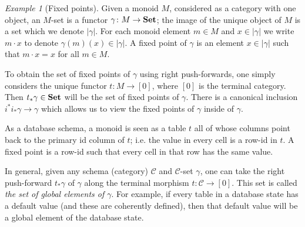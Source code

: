 \documentclass{amsart}
\def\mc{\mathcal}
\def\to{\rightarrow}
\def\taking{\colon}
\def\Set{{\bf Set}}
\def\mcC{\mc{C}}
\theoremstyle{remark}
\newtheorem{example}[theorem]{Example}
\theoremstyle{definition}
\begin{document}
\begin{example}[Fixed points]

Given a monoid $M$, considered as a category with one object, an $M$-set is a functor $\gamma\taking M\to\Set$; the image of the unique object of $M$ is a set which we denote $|\gamma|$.  For each monoid element $m\in M$ and $x\in|\gamma|$ we write $m\cdot x$ to denote $\gamma(m)(x)\in|\gamma|$.  A fixed point of $\gamma$ is an element $x\in|\gamma|$ such that $m\cdot x=x$ for all $m\in M$.  

To obtain the set of fixed points of $\gamma$ using right push-forwards, one simply considers the unique functor $t\taking M\to[0]$, where $[0]$ is the terminal category.  Then $t_*\gamma\in\Set$ will be the set of fixed points of $\gamma$.  There is a canonical inclusion $i^*i_*\gamma\to\gamma$ which allows us to view the fixed points of $\gamma$ inside of $\gamma$.

As a database schema, a monoid is seen as a table $t$ all of whose columns point back to the primary id column of $t$; i.e. the value in every cell is a row-id in $t$.  A fixed point is a row-id such that every cell in that row has the same value.

In general, given any schema (category) $\mcC$ and $\mcC$-set $\gamma$, one can take the right push-forward $t_*\gamma$ of $\gamma$ along the terminal morphism $t\taking\mcC\to[0]$.  This set is called {\em the set of global elements of $\gamma$}.  For example, if every table in a database state has a default value (and these are coherently defined), then that default value will be a global element of the database state.

\end{example}
\end{document}
